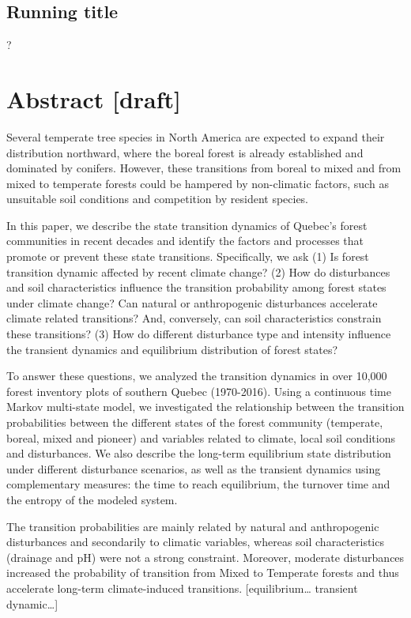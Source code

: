 \documentclass[a4paperpaper,]{article}
\begin{document}
\hypertarget{running-title}{%
\subsection{Running title}\label{running-title}}

?

\hypertarget{abstract-draft}{%
\section{Abstract {[}draft{]}}\label{abstract-draft}}

Several temperate tree species in North America are expected to expand
their distribution northward, where the boreal forest is already
established and dominated by conifers. However, these transitions from
boreal to mixed and from mixed to temperate forests could be hampered by
non-climatic factors, such as unsuitable soil conditions and competition
by resident species.

In this paper, we describe the state transition dynamics of Quebec's
forest communities in recent decades and identify the factors and
processes that promote or prevent these state transitions. Specifically,
we ask (1) Is forest transition dynamic affected by recent climate
change? (2) How do disturbances and soil characteristics influence the
transition probability among forest states under climate change? Can
natural or anthropogenic disturbances accelerate climate related
transitions? And, conversely, can soil characteristics constrain these
transitions? (3) How do different disturbance type and intensity
influence the transient dynamics and equilibrium distribution of forest
states?

To answer these questions, we analyzed the transition dynamics in over
10,000 forest inventory plots of southern Quebec (1970-2016). Using a
continuous time Markov multi-state model, we investigated the
relationship between the transition probabilities between the different
states of the forest community (temperate, boreal, mixed and pioneer)
and variables related to climate, local soil conditions and
disturbances. We also describe the long-term equilibrium state
distribution under different disturbance scenarios, as well as the
transient dynamics using complementary measures: the time to reach
equilibrium, the turnover time and the entropy of the modeled system.

The transition probabilities are mainly related by natural and
anthropogenic disturbances and secondarily to climatic variables,
whereas soil characteristics (drainage and pH) were not a strong
constraint. Moreover, moderate disturbances increased the probability of
transition from Mixed to Temperate forests and thus accelerate long-term
climate-induced transitions. {[}equilibrium\ldots{} transient
dynamic\ldots{}{]}
\end{document}
